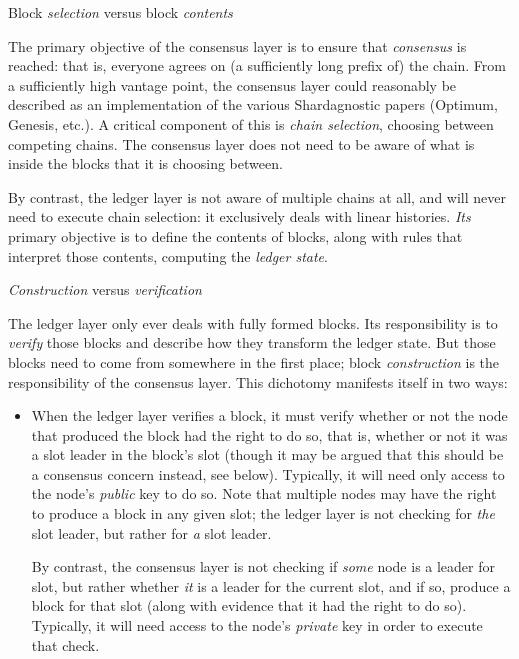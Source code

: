 \begin{description}
\item{Block \emph{selection} versus block \emph{contents}}

The primary objective of the consensus layer is to ensure that \emph{consensus}
is reached: that is, everyone agrees on (a sufficiently long prefix of) the
chain. From a sufficiently high vantage point, the consensus layer could
reasonably be described as an implementation of the various Shardagnostic papers
(Optimum, Genesis, etc.). A critical component of this is \emph{chain selection},
choosing between competing chains. The consensus layer does not need to be aware
of what is inside the blocks that it is choosing between.

By contrast, the ledger layer is not aware of multiple chains at all, and will
never need to execute chain selection: it exclusively deals with linear
histories. \emph{Its} primary objective is to define the contents of blocks,
along with rules that interpret those contents, computing the \emph{ledger
state}.

\item{\emph{Construction} versus \emph{verification}}

The ledger layer only ever deals with fully formed blocks. Its responsibility is
to \emph{verify} those blocks and describe how they transform the ledger state.
But those blocks need to come from somewhere in the first place; block
\emph{construction} is the responsibility of the consensus layer. This dichotomy
manifests itself in two ways:

\begin{itemize}
\item When the ledger layer verifies a block, it must verify whether or not the
node that produced the block had the right to do so, that is, whether or not it
was a slot leader in the block's slot (though it may be argued that this should
be a consensus concern instead, see below). Typically, it will need only access
to the node's \emph{public} key to do so. Note that multiple nodes may have the
right to produce a block in any given slot; the ledger layer is not checking
for \emph{the} slot leader, but rather for \emph{a} slot leader.

By contrast, the consensus layer is not checking if \emph{some} node is a leader
for slot, but rather whether \emph{it} is a leader for the current slot, and if
so, produce a block for that slot (along with evidence that it had the right to
do so). Typically, it will need access to the node's \emph{private} key in order
to execute that check.


\end{itemize}
\end{description}
